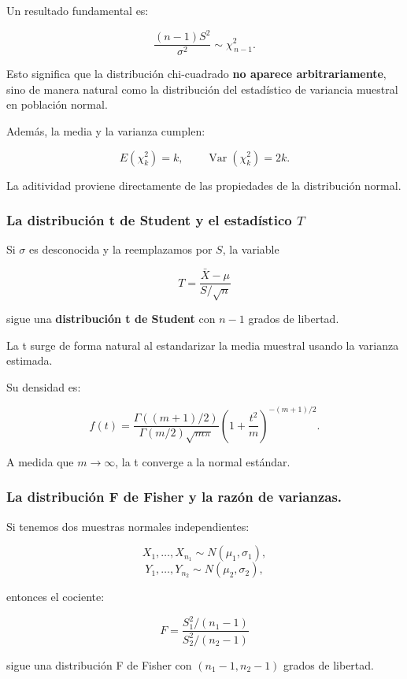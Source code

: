 \documentclass[
]{article}
\begin{document}
Un resultado fundamental es:

\[
\frac{(n-1)S^2}{\sigma^2} \sim \chi^2_{\,n-1}.
\]

Esto significa que la distribución chi-cuadrado \textbf{no aparece arbitrariamente}, sino de manera natural como la distribución del estadístico de variancia muestral en población normal.

Además, la media y la varianza cumplen:

\[
E(\chi_k^2)=k,\qquad 
\operatorname{Var}(\chi_k^2)=2k.
\]

La aditividad proviene directamente de las propiedades de la distribución normal.

\subsubsection{\texorpdfstring{La distribución t de Student y el estadístico \(T\)}{La distribución t de Student y el estadístico T}}\label{la-distribuciuxf3n-t-de-student-y-el-estaduxedstico-t}

Si \(\sigma\) es desconocida y la reemplazamos por \(S\), la variable

\[
T = \frac{\bar X - \mu}{S/\sqrt{n}}
\]

sigue una \textbf{distribución t de Student} con \(n-1\) grados de libertad.

La t surge de forma natural al estandarizar la media muestral usando la varianza estimada.

Su densidad es:

\[
f(t)=
\frac{\Gamma((m+1)/2)}{\Gamma(m/2)\sqrt{m\pi}}
\left(1 + \frac{t^2}{m}\right)^{-(m+1)/2}.
\]

A medida que \(m\to\infty\), la t converge a la normal estándar.

\subsubsection{La distribución F de Fisher y la razón de varianzas.}\label{la-distribuciuxf3n-f-de-fisher-y-la-razuxf3n-de-varianzas.}

Si tenemos dos muestras normales independientes:

\[
X_1,\ldots,X_{n_1} \sim N(\mu_1,\sigma_1),
\]
\[
Y_1,\ldots,Y_{n_2} \sim N(\mu_2,\sigma_2),
\]

entonces el cociente:

\[
F = \frac{S_1^2/(n_1-1)}{S_2^2/(n_2-1)}
\]

sigue una distribución F de Fisher con \((n_1-1,n_2-1)\) grados de libertad.
\end{document}
